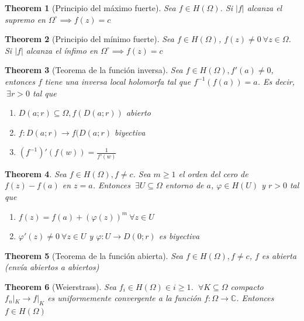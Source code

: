 \documentclass{myclass}
\newtheorem*{theorem}{Theorem}
\begin{document}
\begin{theorem}[Principio del máximo fuerte]
Sea $f\in H(\Omega)$. Si $|f|$ alcanza el supremo en $\Omega^{\circ} \implies f(z) = c$
\end{theorem}

\begin{theorem}[Principio del mínimo fuerte]
Sea $f\in H(\Omega)$, $f(z)\neq 0 \ \forall z\in \Omega$. Si $|f|$ alcanza el ínfimo en  $\Omega^\circ \implies f(z) = c$
\end{theorem}

\begin{theorem}[Teorema de la función inversa] Sea $f\in H(\Omega), f'(a)\neq 0$, entonces $f$ tiene una inversa local holomorfa tal que  $f^{-1}(f(a))=a$. Es decir, $\ \exists r>0$ tal que
  \begin{enumerate}[topsep=-6pt, itemsep=0pt]
    \item $D(a;r) \subseteq  \Omega, f(D(a;r))$ abierto
	\item $f: D(a;r) \to f(D(a;r)$ biyectiva
	\item $(f^{-1})'(f(w))=\frac{1}{f'(w)}$
  \end{enumerate}
\end{theorem}

\begin{theorem} Sea $f\in H(\Omega), f\neq c$. Sea $m\ge 1$ el orden del cero de $f(z)-f(a)$ en  $z = a$. Entonces  $\ \exists U\subseteq \Omega$ entorno de $a$, $\varphi \in H(U)$ y $r>0$ tal que
   \begin{enumerate}[topsep=-6pt, itemsep=0pt]
    \item $f(z) = f(a) + (\varphi (z))^m \ \forall z\in U$
	\item $\varphi '(z) \neq 0 \ \forall z\in U$ y $\varphi : U \to D(0;r)$ es biyectiva
  \end{enumerate}
\end{theorem}

\begin{theorem}[Teorema de la función abierta]
Sea $f\in H(\Omega), f\neq c$,  $f$ es abierta (envía abiertos a abiertos)
\end{theorem}

\begin{theorem}[Weierstrass]
Sea $f_i \in H(\Omega) \in i\ge 1$. $\ \forall K\subseteq \Omega$ compacto $f_n|_K \to f|_K$ es uniformemente convergente a la función $f:\Omega \to \mathbb{C}$. Entonces $f\in H(\Omega)$
\end{theorem}
\end{document}
